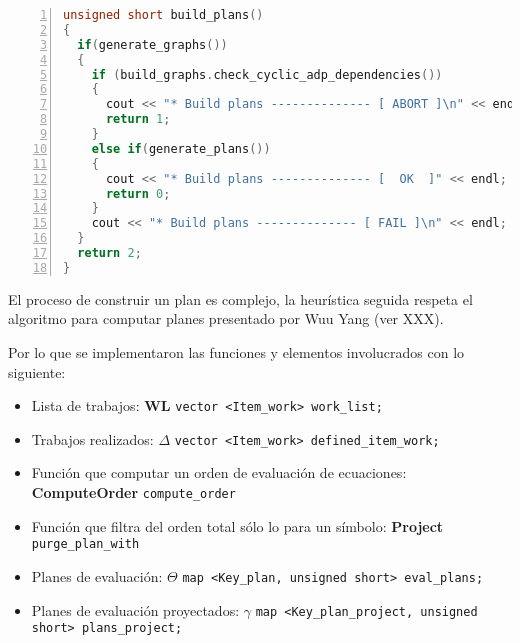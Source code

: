 \begin{lstlisting}[language=C++, basicstyle=\scriptsize, numbers=left, numbersep=5pt, numberstyle=\tiny]
unsigned short build_plans()
{
  if(generate_graphs())
  {
    if (build_graphs.check_cyclic_adp_dependencies())
    {
      cout << "* Build plans -------------- [ ABORT ]\n" << endl;
      return 1;
    }
    else if(generate_plans())
    {
      cout << "* Build plans -------------- [  OK  ]" << endl;
      return 0;
    }
    cout << "* Build plans -------------- [ FAIL ]\n" << endl;
  }
  return 2;
}
\end{lstlisting}

El proceso de construir un plan es complejo, la heurística seguida respeta el algoritmo para computar planes presentado por Wuu Yang (ver XXX).

Por lo que se implementaron las funciones y elementos involucrados con lo siguiente:

\begin{itemize}
\item Lista de trabajos: \textbf{WL} \flecha \texttt{vector <Item\_work>\ work\_list;}
\item Trabajos realizados: {\LARGE\textbf{$\Delta$}} \flecha \texttt{vector <Item\_work>\ defined\_item\_work;}
\item Función que computar un orden de evaluación de ecuaciones: \textbf{ComputeOrder} \flecha \texttt{compute\_order}
\item Función que filtra del orden total sólo lo para un símbolo: \textbf{Project} \flecha \texttt{purge\_plan\_with}
\item Planes de evaluación: {\LARGE\textbf{$\Theta$}} \flecha \texttt{map <Key\_plan, unsigned short>\ eval\_plans;}
\item Planes de evaluación proyectados: {\LARGE\textbf{$\gamma$}} \flecha \texttt{map <Key\_plan\_project, unsigned short>\ plans\_project;}
\end{itemize}

\normalsize

